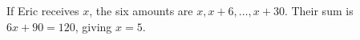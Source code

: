 If Eric receives $x$, the six amounts are $x,x+6,\ldots,x+30$. Their sum is $6x+90=120$, giving $\boxed{x=5}$.
